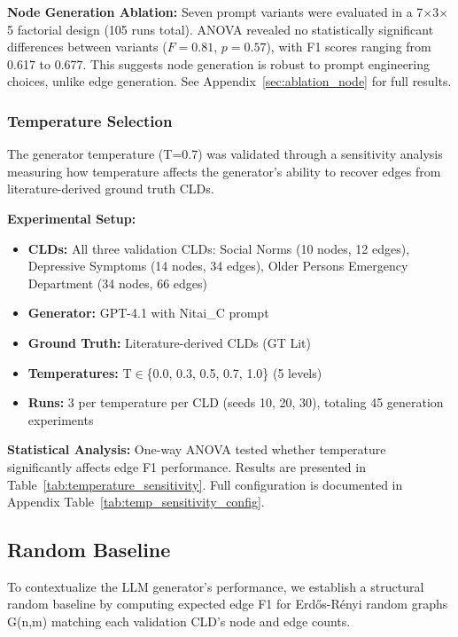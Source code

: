\textbf{Node Generation Ablation:} Seven prompt variants were evaluated in a 7$\times$3$\times$5 factorial design (105 runs total). ANOVA revealed no statistically significant differences between variants ($F=0.81$, $p=0.57$), with F1 scores ranging from 0.617 to 0.677. This suggests node generation is robust to prompt engineering choices, unlike edge generation. See Appendix~\ref{sec:ablation_node} for full results.

\subsubsection{Temperature Selection}

The generator temperature (T=0.7) was validated through a sensitivity analysis measuring how temperature affects the generator's ability to recover edges from literature-derived ground truth CLDs.

\textbf{Experimental Setup:}
\begin{itemize}[noitemsep]
    \item \textbf{CLDs:} All three validation CLDs: Social Norms (10 nodes, 12 edges), Depressive Symptoms (14 nodes, 34 edges), Older Persons Emergency Department (34 nodes, 66 edges)
    \item \textbf{Generator:} GPT-4.1 with Nitai\_C prompt
    \item \textbf{Ground Truth:} Literature-derived CLDs (GT Lit)
    \item \textbf{Temperatures:} T$\in$\{0.0, 0.3, 0.5, 0.7, 1.0\} (5 levels)
    \item \textbf{Runs:} 3 per temperature per CLD (seeds 10, 20, 30), totaling 45 generation experiments
\end{itemize}

\textbf{Statistical Analysis:} One-way ANOVA tested whether temperature significantly affects edge F1 performance. Results are presented in Table~\ref{tab:temperature_sensitivity}. Full configuration is documented in Appendix Table~\ref{tab:temp_sensitivity_config}.

\subsection{Random Baseline}

To contextualize the LLM generator's performance, we establish a structural random baseline by computing expected edge F1 for Erd\H{o}s-R\'enyi random graphs G(n,m) matching each validation CLD's node and edge counts.

